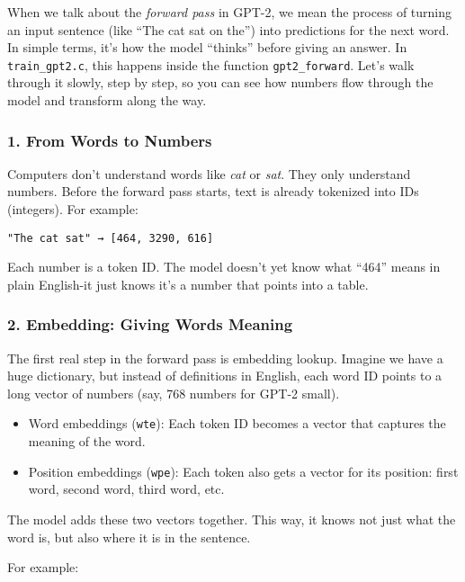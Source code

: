 \documentclass[
  letterpaper,
  DIV=11,
  numbers=noendperiod]{scrreprt}
\providecommand{\tightlist}{%
  \setlength{\itemsep}{0pt}\setlength{\parskip}{0pt}}
\begin{document}
When we talk about the \emph{forward pass} in GPT-2, we mean the process
of turning an input sentence (like ``The cat sat on the'') into
predictions for the next word. In simple terms, it's how the model
``thinks'' before giving an answer. In \texttt{train\_gpt2.c}, this
happens inside the function \texttt{gpt2\_forward}. Let's walk through
it slowly, step by step, so you can see how numbers flow through the
model and transform along the way.

\subsubsection{1. From Words to Numbers}\label{from-words-to-numbers}

Computers don't understand words like \emph{cat} or \emph{sat}. They
only understand numbers. Before the forward pass starts, text is already
tokenized into IDs (integers). For example:

\begin{verbatim}
"The cat sat" → [464, 3290, 616]
\end{verbatim}

Each number is a token ID. The model doesn't yet know what ``464'' means
in plain English-it just knows it's a number that points into a table.

\subsubsection{2. Embedding: Giving Words
Meaning}\label{embedding-giving-words-meaning}

The first real step in the forward pass is embedding lookup. Imagine we
have a huge dictionary, but instead of definitions in English, each word
ID points to a long vector of numbers (say, 768 numbers for GPT-2
small).

\begin{itemize}
\tightlist
\item
  Word embeddings (\texttt{wte}): Each token ID becomes a vector that
  captures the meaning of the word.
\item
  Position embeddings (\texttt{wpe}): Each token also gets a vector for
  its position: first word, second word, third word, etc.
\end{itemize}

The model adds these two vectors together. This way, it knows not just
what the word is, but also where it is in the sentence.

For example:
\end{document}
